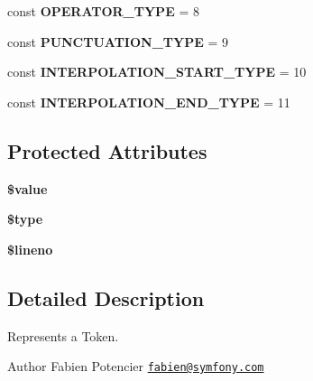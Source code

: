 \begin{DoxyCompactItemize}
\item 
\hypertarget{class_twig___token_a143eb58464c5398fe7aeb1d482d5822f}{}const {\bfseries O\+P\+E\+R\+A\+T\+O\+R\+\_\+\+T\+Y\+P\+E} = 8\label{class_twig___token_a143eb58464c5398fe7aeb1d482d5822f}

\item 
\hypertarget{class_twig___token_a096168514425d8726b9baa79da07b24d}{}const {\bfseries P\+U\+N\+C\+T\+U\+A\+T\+I\+O\+N\+\_\+\+T\+Y\+P\+E} = 9\label{class_twig___token_a096168514425d8726b9baa79da07b24d}

\item 
\hypertarget{class_twig___token_a74d54f60a6d271eb3b268a00b0fca731}{}const {\bfseries I\+N\+T\+E\+R\+P\+O\+L\+A\+T\+I\+O\+N\+\_\+\+S\+T\+A\+R\+T\+\_\+\+T\+Y\+P\+E} = 10\label{class_twig___token_a74d54f60a6d271eb3b268a00b0fca731}

\item 
\hypertarget{class_twig___token_a6f5d78c437002c2ab0496c6322a940fb}{}const {\bfseries I\+N\+T\+E\+R\+P\+O\+L\+A\+T\+I\+O\+N\+\_\+\+E\+N\+D\+\_\+\+T\+Y\+P\+E} = 11\label{class_twig___token_a6f5d78c437002c2ab0496c6322a940fb}

\end{DoxyCompactItemize}
\subsection*{Protected Attributes}
\begin{DoxyCompactItemize}
\item 
\hypertarget{class_twig___token_a0f298096f322952a72a50f98a74c7b60}{}{\bfseries \$value}\label{class_twig___token_a0f298096f322952a72a50f98a74c7b60}

\item 
\hypertarget{class_twig___token_a9a4a6fba2208984cabb3afacadf33919}{}{\bfseries \$type}\label{class_twig___token_a9a4a6fba2208984cabb3afacadf33919}

\item 
\hypertarget{class_twig___token_a865384ce49abf1c78f8aea48c7b5aa48}{}{\bfseries \$lineno}\label{class_twig___token_a865384ce49abf1c78f8aea48c7b5aa48}

\end{DoxyCompactItemize}


\subsection{Detailed Description}
Represents a Token.

\begin{DoxyAuthor}{Author}
Fabien Potencier \href{mailto:fabien@symfony.com}{\tt fabien@symfony.\+com} 
\end{DoxyAuthor}



